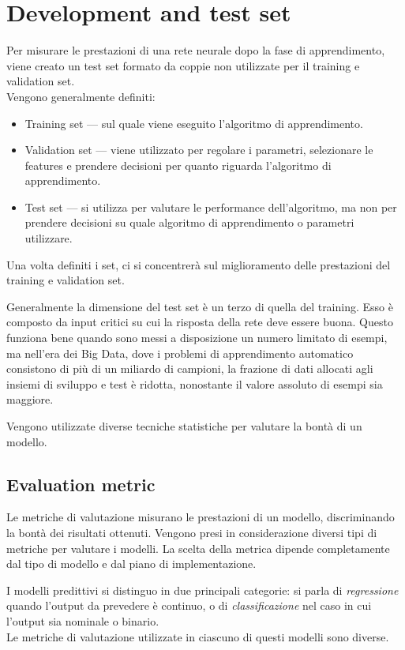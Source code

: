 \section{Development and test set}
\label{sec:DevelopmentAndTestSet}
Per misurare le prestazioni di una rete neurale dopo la fase di apprendimento, viene creato un test set formato da coppie non utilizzate per il training e validation set.\\
Vengono generalmente definiti: 
\begin{itemize}
	\item Training set --- sul quale viene eseguito l'algoritmo di apprendimento.
	\item Validation set --- viene utilizzato per regolare i parametri, selezionare le features e prendere decisioni per quanto riguarda l'algoritmo di apprendimento.
	\item Test set --- si utilizza per valutare le performance dell'algoritmo, ma non per prendere decisioni su quale algoritmo di apprendimento o parametri utilizzare. 
\end{itemize}

Una volta definiti i set, ci si concentrerà sul miglioramento delle prestazioni del training e validation set. 

Generalmente la dimensione del test set è un terzo di quella del training. Esso è composto da input critici su cui la risposta della rete deve essere buona. 
Questo funziona bene quando sono messi a disposizione un numero limitato di esempi, ma nell'era dei Big Data, dove i problemi di apprendimento automatico consistono di più di un miliardo di campioni, la frazione di dati allocati agli insiemi di sviluppo e test è ridotta, nonostante il valore assoluto di esempi sia maggiore.

Vengono utilizzate diverse tecniche statistiche per valutare la bontà di un modello.

\subsection{Evaluation metric}
\label{subsec:EvaluationMetric}

Le metriche di valutazione misurano le prestazioni di un modello, discriminando la bontà dei risultati ottenuti.
Vengono presi in considerazione diversi tipi di metriche per valutare i modelli. La scelta della metrica dipende completamente dal tipo di modello e dal piano di implementazione. 

I modelli predittivi si distinguo in due principali categorie: si parla di \emph{regressione} quando l'output da prevedere è continuo, o di \emph{classificazione} nel caso in cui l'output sia nominale o binario. \\
Le metriche di valutazione utilizzate in ciascuno di questi modelli sono diverse.

